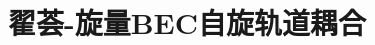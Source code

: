 \documentclass{article}
\begin{document}
    \title{翟荟-旋量BEC自旋轨道耦合}
    \maketitle
    
\end{document}
